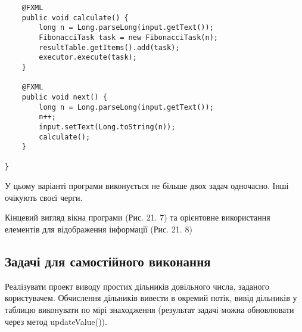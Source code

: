 \begin{enumerate}
\begin{verbatim}
	@FXML
	public void calculate() {
		long n = Long.parseLong(input.getText());
		FibonacciTask task = new FibonacciTask(n);
		resultTable.getItems().add(task);
		executor.execute(task);
	}

	@FXML
	public void next() {
		long n = Long.parseLong(input.getText());
		n++;
		input.setText(Long.toString(n));
		calculate();
	}

}
\end{verbatim}

	У цьому варіанті програми виконується не більше двох задач одночасно. Інші очікують своєї черги.

	Кінцевий вигляд вікна програми (Рис. 21. 7) та орієнтовне використання елементів для відображення інформації (Рис. 21. 8)
\end{enumerate}

\subsection{Задачі для самостійного виконання}
Реалізувати проект виводу простих дільників довільного числа, заданого користувачем. Обчислення дільників вивести в окремий потік, вивід дільників у таблицю виконувати по мірі знаходження (результат  задачі можна обновлювати через метод updateValue()).